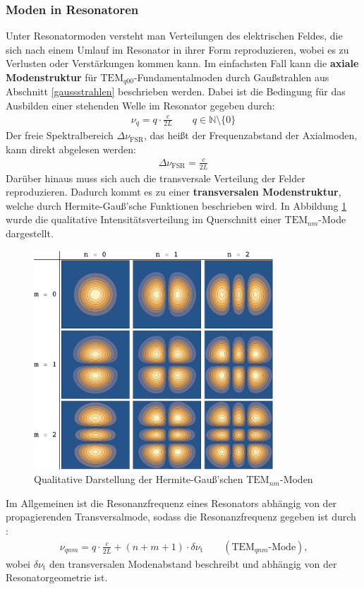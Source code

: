 \documentclass[11pt, a4paper]{article}
\numberwithin{equation}{section}
\begin{document}
\subsubsection{Moden in Resonatoren}
Unter Resonatormoden versteht man Verteilungen des elektrischen Feldes, die sich nach einem Umlauf im Resonator in ihrer Form reproduzieren, wobei es zu Verlusten oder Verstärkungen kommen kann.
Im einfachsten Fall kann die \textbf{axiale Modenstruktur} für $\mathrm{TEM}_{q00}$-Fundamentalmoden durch Gaußstrahlen aus Abschnitt \ref{gaussstrahlen} beschrieben werden.
Dabei ist die Bedingung für das Ausbilden einer stehenden Welle im Resonator gegeben durch:
\begin{align}
	\nu_q = q \cdot \frac{c}{2 L} \qquad q \in \mathbb{N} \setminus \{0\}
\end{align}
Der freie Spektralbereich $\Delta \nu_\mathrm{FSR}$, das heißt der Frequenzabstand der Axialmoden, kann direkt abgelesen werden:
\begin{align}
	\Delta \nu_\mathrm{FSR} = \frac{c}{2 L}
	\label{eq:modenabstand}
\end{align}
Darüber hinaus muss sich auch die transversale Verteilung der Felder reproduzieren.
Dadurch kommt es zu einer \textbf{transversalen Modenstruktur}, welche durch Hermite-Gauß'sche Funktionen beschrieben wird.
In Abbildung \ref{fig:transversalmoden} wurde die qualitative Intensitätsverteilung im Querschnitt einer $\mathrm{TEM}_{nm}$-Mode dargestellt.
\begin{figure}[h]
	\centering
	\includegraphics[width=0.8\textwidth]{./figures/transversalmoden.png}
	\caption{Qualitative Darstellung der Hermite-Gauß'schen $\mathrm{TEM}_{nm}$-Moden}
	\label{fig:transversalmoden}
\end{figure}
Im Allgemeinen ist die Resonanzfrequenz eines Resonators abhängig von der propagierenden Transversalmode, sodass die Resonanzfrequenz gegeben ist durch \cite{siegman}:
\begin{align}
	\nu_{qnm} = q \cdot \frac{c}{2 L} + \left( n + m + 1 \right) \cdot \delta \nu_\mathrm{t} \qquad (\mathrm{TEM}_{qnm}\text{-Mode})\text{,}
\end{align}
wobei $\delta \nu_\mathrm{t}$ den transversalen Modenabstand beschreibt und abhängig von der Resonatorgeometrie ist.
\end{document}
